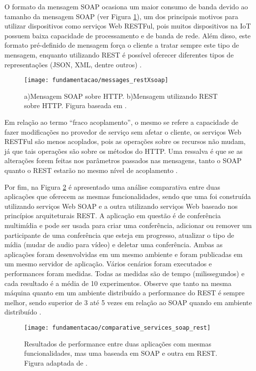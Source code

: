 O formato da mensagem SOAP ocasiona um maior consumo de banda devido ao tamanho da mensagem SOAP (ver Figura \ref{fig:msg_soapXrest}), um dos principais motivos para utilizar dispositivos como serviços Web RESTFul, pois muitos dispositivos na IoT possuem baixa capacidade de processamento e de banda de rede. Além disso, este formato pré-definido de mensagem força o cliente a tratar sempre este tipo de mensagem, enquanto utilizando REST é possível oferecer diferentes tipos de representações (JSON, XML, dentre outros) \cite{Franca:2011}.

\begin{figure}[!htb] \centering 
  \centering
  \texttt{[image: fundamentacao/messages\_restXsoap]} 
  \caption{a)Mensagem SOAP sobre HTTP. b)Mensagem utilizando REST sobre HTTP. Figura baseada em \cite{Pautasso:2014}.}
  \label{fig:msg_soapXrest}
\end{figure}

Em relação ao termo ``fraco acoplamento'', o mesmo se refere a capacidade de fazer modificações no provedor de serviço sem afetar o cliente, os serviços Web RESTFul são menos acoplados, pois as operações sobre os recursos não mudam, já que tais operações são sobre os métodos do HTTP. Uma ressalva é que se as alterações forem feitas nos parâmetros passados nas mensagens, tanto o SOAP quanto o REST estarão no mesmo nível de acoplamento \cite{Franca:2011}.

Por fim, na Figura \ref{fig:comparative_services_soap_rest} é apresentado uma análise comparativa entre duas aplicações que oferecem as mesmas funcionalidades, sendo que uma foi construída utilizando serviços Web SOAP e a outra utilizando serviços Web baseado nos princípios arquiteturais REST. A aplicação em questão é de conferência multimídia e pode ser usada para criar uma conferência, adicionar ou remover um participante de uma conferência que esteja em progresso, atualizar o tipo de mídia (mudar de audio para vídeo) e deletar uma conferência. Ambas as aplicações foram desenvolvidas em um mesmo ambiente e foram publicadas em um mesmo servidor de aplicação. Vários cenários foram executados e performances foram medidas. Todas as medidas são de tempo (milissegundos) e cada resultado é a média de 10 experimentos. Observe que tanto na mesma máquina quanto em um ambiente distribuído a performance do REST é sempre melhor, sendo superior de 3 até 5 vezes em relação ao SOAP quando em ambiente distribuído \cite{Belqasmi:2012}.

\begin{figure}[!htb] \centering 
  \centering
  \texttt{[image: fundamentacao/comparative\_services\_soap\_rest]} 
  \caption{Resultados de performance entre duas aplicações com mesmas funcionalidades, mas uma baseada em SOAP e outra em REST. Figura adaptada de \cite{Belqasmi:2012}.}
  \label{fig:comparative_services_soap_rest}
\end{figure}

